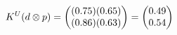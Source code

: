 \documentclass[preview]{standalone}
\begin{document}
\begin{align*}
\special{dvisvgm:raw <g id='unique000'>}K^U(d \otimes p) = \begin{pmatrix} (0.75)(0.65) \\ (0.86)(0.63) \end{pmatrix} = \begin{pmatrix} 0.49 \\ 0.54 \end{pmatrix}\special{dvisvgm:raw </g>}
\end{align*}
\end{document}
